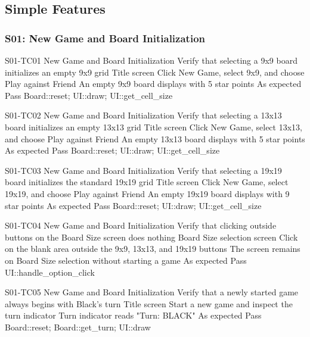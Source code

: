 \subsection{Simple Features}

\subsubsection{S01: New Game and Board Initialization}
    \begin{test}
        {S01-TC01}
        {New Game and Board Initialization}
        {Verify that selecting a 9x9 board initializes an empty 9x9 grid}
        {Title screen}
        {Click New Game, select 9x9, and choose Play against Friend}
        {An empty 9x9 board displays with 5 star points}
        {As expected}
        {Pass}
        {Board::reset; UI::draw; UI::get\_cell\_size}
    \end{test}
    \begin{test}
        {S01-TC02}
        {New Game and Board Initialization}
        {Verify that selecting a 13x13 board initializes an empty 13x13 grid}
        {Title screen}
        {Click New Game, select 13x13, and choose Play against Friend}
        {An empty 13x13 board displays with 5 star points}
        {As expected}
        {Pass}
        {Board::reset; UI::draw; UI::get\_cell\_size}
    \end{test}
    \begin{test}
        {S01-TC03}
        {New Game and Board Initialization}
        {Verify that selecting a 19x19 board initializes the standard 19x19 grid}
        {Title screen}
        {Click New Game, select 19x19, and choose Play against Friend}
        {An empty 19x19 board displays with 9 star points}
        {As expected}
        {Pass}
        {Board::reset; UI::draw; UI::get\_cell\_size}
    \end{test}
    \begin{test}
        {S01-TC04}
        {New Game and Board Initialization}
        {Verify that clicking outside buttons on the Board Size screen does nothing}
        {Board Size selection screen}
        {Click on the blank area outside the 9x9, 13x13, and 19x19 buttons}
        {The screen remains on Board Size selection without starting a game}
        {As expected}
        {Pass}
        {UI::handle\_option\_click}
    \end{test}
    \begin{test}
        {S01-TC05}
        {New Game and Board Initialization}
        {Verify that a newly started game always begins with Black's turn}
        {Title screen}
        {Start a new game and inspect the turn indicator}
        {Turn indicator reads "Turn: BLACK"}
        {As expected}
        {Pass}
        {Board::reset; Board::get\_turn; UI::draw}
    \end{test}
